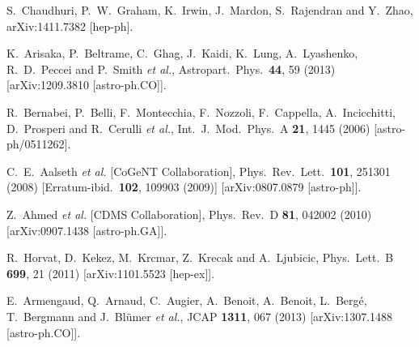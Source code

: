\documentclass[prd,reprint,nofootinbib,notitlepage,aps,tightenlines,preprintnumbers,amsmath,amssymb,showpacs,superscriptaddress]{revtex4-1}
\begin{document}
\begin{thebibliography}{99}
  S.~Chaudhuri, P.~W.~Graham, K.~Irwin, J.~Mardon, S.~Rajendran and Y.~Zhao,
  arXiv:1411.7382 [hep-ph].


  K.~Arisaka, P.~Beltrame, C.~Ghag, J.~Kaidi, K.~Lung, A.~Lyashenko, R.~D.~Peccei and P.~Smith {\it et al.},
  Astropart.\ Phys.\  {\bf 44}, 59 (2013)
  [arXiv:1209.3810 [astro-ph.CO]].


  R.~Bernabei, P.~Belli, F.~Montecchia, F.~Nozzoli, F.~Cappella, A.~Incicchitti, D.~Prosperi and R.~Cerulli {\it et al.},
  Int.\ J.\ Mod.\ Phys.\ A {\bf 21}, 1445 (2006)
  [astro-ph/0511262].


  C.~E.~Aalseth {\it et al.}  [CoGeNT Collaboration],
  Phys.\ Rev.\ Lett.\  {\bf 101}, 251301 (2008)
  [Erratum-ibid.\  {\bf 102}, 109903 (2009)]
  [arXiv:0807.0879 [astro-ph]].

  Z.~Ahmed {\it et al.}  [CDMS Collaboration],
  Phys.\ Rev.\ D {\bf 81}, 042002 (2010)
  [arXiv:0907.1438 [astro-ph.GA]].


  R.~Horvat, D.~Kekez, M.~Krcmar, Z.~Krecak and A.~Ljubicic,
  Phys.\ Lett.\ B {\bf 699}, 21 (2011)
  [arXiv:1101.5523 [hep-ex]].

  E.~Armengaud, Q.~Arnaud, C.~Augier, A.~Benoit, A.~Benoit, L.~Bergé, T.~Bergmann and J.~Blümer {\it et al.},
  JCAP {\bf 1311}, 067 (2013)
  [arXiv:1307.1488 [astro-ph.CO]].


\end{thebibliography}
\end{document}
